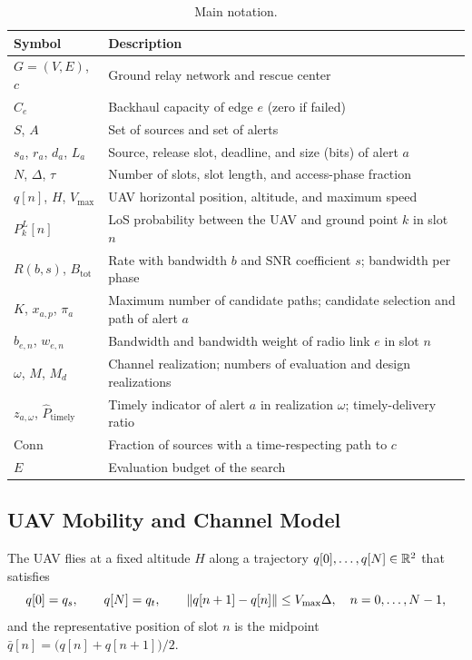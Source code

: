 \begin{table}[htbp]
\centering
\small
\caption{Main notation.}
\label{tab:notation}
\begin{tabularx}{\textwidth}{@{}>{\raggedright\arraybackslash}p{}X@{}}
\toprule
\textbf{Symbol} & \textbf{Description} \\
\midrule
$G=(V,E)$, $c$ & Ground relay network and rescue center \\
$C_e$ & Backhaul capacity of edge $e$ (zero if failed) \\
$S$, $A$ & Set of sources and set of alerts \\
$s_a$, $r_a$, $d_a$, $L_a$ & Source, release slot, deadline, and size (bits) of alert $a$ \\
$N$, $\Delta$, $\tau$ & Number of slots, slot length, and access-phase fraction \\
$q[n]$, $H$, $V_{\max}$ & UAV horizontal position, altitude, and maximum speed \\
$P_k^{L}[n]$ & LoS probability between the UAV and ground point $k$ in slot $n$ \\
$R(b,s)$, $B_{\mathrm{tot}}$ & Rate with bandwidth $b$ and SNR coefficient $s$; bandwidth per phase \\
$K$, $x_{a,p}$, $\pi_a$ & Maximum number of candidate paths; candidate selection and path of alert $a$ \\
$b_{e,n}$, $w_{e,n}$ & Bandwidth and bandwidth weight of radio link $e$ in slot $n$ \\
$\omega$, $M$, $M_d$ & Channel realization; numbers of evaluation and design realizations \\
$z_{a,\omega}$, $\hat P_{\mathrm{timely}}$ & Timely indicator of alert $a$ in realization $\omega$; timely-delivery ratio \\
$\mathrm{Conn}$ & Fraction of sources with a time-respecting path to $c$ \\
$E$ & Evaluation budget of the search \\
\bottomrule
\end{tabularx}
\end{table}

\subsection{UAV Mobility and Channel Model}
\label{sec:channel}

The UAV flies at a fixed altitude $H$ along a trajectory $q[0],\dots,q[N]\in\mathbb{R}^2$ that satisfies
\begin{equation}
\label{eq:mobility}
q[0]=q_s,\qquad q[N]=q_t,\qquad \lVert q[n+1]-q[n]\rVert\le V_{\max}\Delta,\quad n=0,\dots,N-1,
\end{equation}
and the representative position of slot $n$ is the midpoint $\bar q[n]=\bigl(q[n]+q[n+1]\bigr)/2$.

